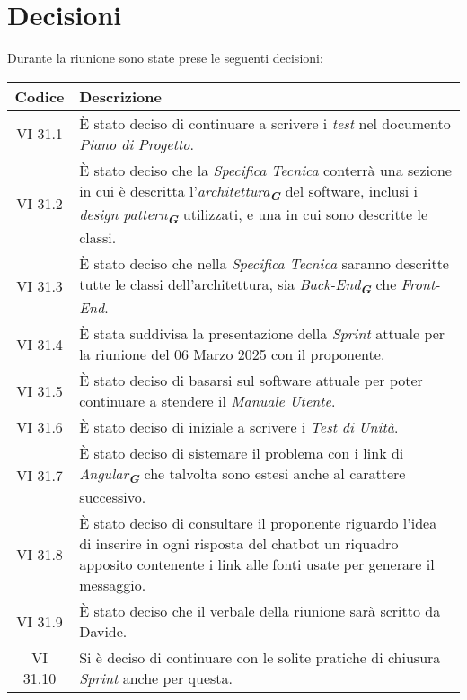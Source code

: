 
\section{Decisioni}

Durante la riunione sono state prese le seguenti decisioni:

\vspace{0.5cm}

\begin{table}[htbp]
    \centering
    \begin{tabular}{|c|p{}|}
        \hline
        \rowcolor[gray]{0.75}
        \textbf{Codice} & \textbf{Descrizione}\\
        \hline
        VI 31.1 & È stato deciso di continuare a scrivere i \emph{test} nel documento \emph{Piano di Progetto}.\\
        \hline
        VI 31.2 & È stato deciso che la \emph{Specifica Tecnica} conterrà una sezione in cui è descritta l'\emph{architettura}\textsubscript{\textit{\textbf{G}}} del software, inclusi i \emph{design pattern}\textsubscript{\textit{\textbf{G}}} utilizzati, e una in cui sono descritte le classi.\\
        \hline
        VI 31.3 & È stato deciso che nella \emph{Specifica Tecnica} saranno descritte tutte le classi dell'architettura, sia \emph{Back-End}\textsubscript{\textit{\textbf{G}}} che \emph{Front-End}.\\
        \hline 
        VI 31.4 & È stata suddivisa la presentazione della \emph{Sprint} attuale per la riunione del 06 Marzo 2025 con il proponente. \\
        \hline
        VI 31.5 & È stato deciso di basarsi sul software attuale per poter continuare a stendere il \emph{Manuale Utente}.\\
        \hline
        VI 31.6 & È stato deciso di iniziale a scrivere i \emph{Test di Unità}. \\
        \hline
        VI 31.7 & È stato deciso di sistemare il problema con i link di \emph{Angular}\textsubscript{\textit{\textbf{G}}} che talvolta sono estesi anche al carattere successivo. \\
        \hline
        VI 31.8 & È stato deciso di consultare il proponente riguardo l'idea di inserire in ogni risposta del chatbot un riquadro apposito contenente i link alle fonti usate per generare il messaggio. \\
        \hline
        VI 31.9 & È stato deciso che il verbale della riunione sarà scritto da Davide. \\
        \hline
        VI 31.10 & Si è deciso di continuare con le solite pratiche di chiusura \emph{Sprint} anche per questa. \\
        \hline
    \end{tabular}
\end{table}